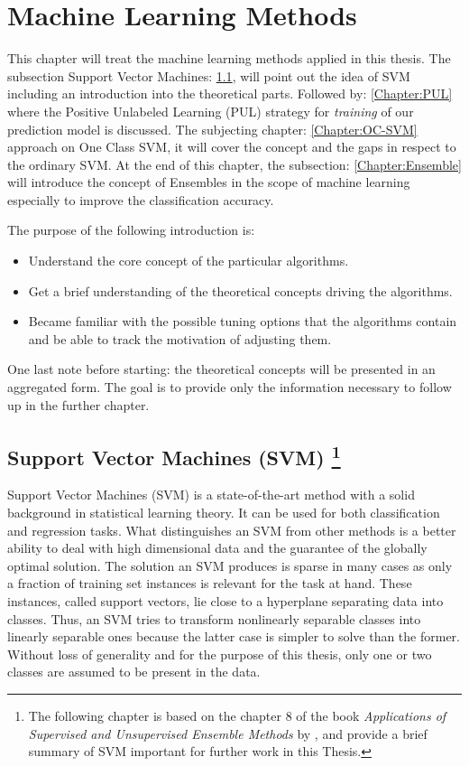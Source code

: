 \chapter{Machine Learning Methods}\label{ch:3}
This chapter will treat the machine learning methods applied in this thesis. The subsection Support Vector Machines: \ref{Chapter:SVM}, will point out the idea of SVM including an introduction into the theoretical parts. Followed by: \ref{Chapter:PUL} where the Positive Unlabeled Learning (PUL) strategy for \textit{training} of our prediction model is discussed. The subjecting chapter: \ref{Chapter:OC-SVM} approach on One Class SVM, it will cover the concept and the gaps in respect to the ordinary SVM. At the end of this chapter, the subsection: \ref{Chapter:Ensemble} will introduce the concept of Ensembles in the scope of machine learning especially to improve the classification accuracy.

The purpose of the following introduction is:
\begin{itemize}
    \item Understand the core concept of the particular algorithms.
    
    \item Get a brief understanding of the theoretical concepts driving the algorithms.
    
    \item Became familiar with the possible tuning options that the algorithms contain and be able to track the motivation of adjusting them.
\end{itemize}
One last note before starting: the theoretical concepts will be presented in an aggregated form. The goal is to provide only the information necessary to follow up in the further chapter. 


\section[Support Vector Machines (SVM)] {Support Vector Machines (SVM) \footnote{The following chapter is based on the chapter 8 of the book \textit{Applications of Supervised and Unsupervised Ensemble Methods} by \cite{Okun;Valentini:2009}, and provide a brief summary of SVM important for further work in this Thesis. } }\label{Chapter:SVM}

Support Vector Machines (SVM) \cite{Cortes;Vapnik:1995} is a state-of-the-art method with a solid background in statistical learning theory. It can be used for both classification and regression tasks. What distinguishes an SVM from other methods is a better ability to deal with high dimensional data and the guarantee of the globally optimal solution. The solution an SVM produces is sparse in many cases as only a fraction of training set instances is relevant for the task at hand. These instances, called support vectors, lie close to a hyperplane separating data into classes. Thus, an SVM tries to transform nonlinearly separable classes into linearly separable ones because the latter case is simpler to solve than the former. Without loss of generality and for the purpose of this thesis, only one or two classes are assumed to be present in the data.

